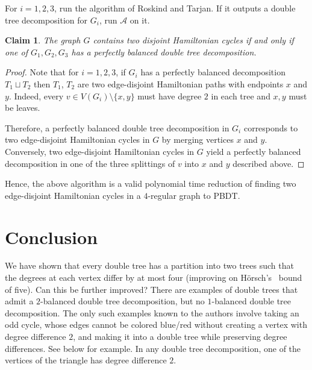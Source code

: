 \documentclass[11pt, reqno, a4paper]{article}
\newtheorem{claim}{Claim}
\theoremstyle{definition}
\numberwithin{equation}{section}
\begin{document}
For $i=1,2,3$, run the algorithm of Roskind and Tarjan. 
If it outputs a double tree decomposition for $G_i$, 
run $\mathcal{A}$ on it.
\begin{claim}
The graph $G$ contains two disjoint Hamiltonian cycles if and only if one of $G_1,G_2,G_3$ has a perfectly balanced double tree decomposition.
\end{claim}
\begin{proof}
Note that for $i=1,2,3$, if $G_i$ has a perfectly balanced decomposition $T_1\sqcup T_2$ then $T_1$, $T_2$ are two edge-disjoint Hamiltonian paths with endpoints $x$ and $y$.
Indeed, every $v\in V(G_i)\setminus \{x,y\}$ must have degree $2$ in each tree and $x,y$ must be leaves. 

Therefore, a perfectly balanced double tree decomposition in $G_i$ corresponds to two edge-disjoint Hamiltonian cycles in $G$ by merging vertices $x$ and $y$. 
Conversely, two edge-disjoint Hamiltonian cycles in $G$ yield a perfectly balanced decomposition in one of the three splittings of $v$ into $x$ and $y$ described above.
\end{proof}

Hence, the above algorithm is a valid polynomial time reduction of finding two edge-disjoint Hamiltonian cycles in a $4$-regular graph to PBDT.

\section{Conclusion}\label{sec:conc}
We have shown that every double tree has a partition into two trees such that the degrees at each vertex differ by at most four (improving on H\"{o}rsch's~\cite{horsch2021globally} bound of five). Can this be further improved? There are examples of double trees that admit a $2$-balanced double tree decomposition, but no $1$-balanced double tree decomposition.
The only such examples known to the authors involve taking an odd cycle, 
whose edges cannot be colored blue/red without creating a vertex with degree difference $2$, 
and making it into a double tree while preserving degree differences.
See below for example.
In any double tree decomposition, one of the vertices of the triangle has degree difference $2$.
\begin{figure}[ht] 
    \centering
\end{figure}
\end{document}
